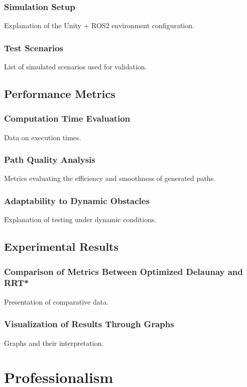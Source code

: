 \documentclass[a4paper,12pt]{report}
\begin{document}
\subsection{Simulation Setup}
Explanation of the Unity + ROS2 environment configuration.

\subsection{Test Scenarios}
List of simulated scenarios used for validation.

\section{Performance Metrics}
\subsection{Computation Time Evaluation}
Data on execution times.

\subsection{Path Quality Analysis}
Metrics evaluating the efficiency and smoothness of generated paths.

\subsection{Adaptability to Dynamic Obstacles}
Explanation of testing under dynamic conditions.

\section{Experimental Results}
\subsection{Comparison of Metrics Between Optimized Delaunay and RRT*}
Presentation of comparative data.

\subsection{Visualization of Results Through Graphs}
Graphs and their interpretation.

\newpage

\chapter{Professionalism}
\end{document}
